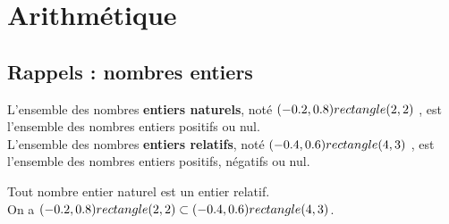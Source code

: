 



\chapter{Arithmétique}



\section{Rappels : nombres entiers}

\begin{Définition}
L'ensemble des nombres {\bf{entiers naturels}}, noté $(-0.2,0.8) rectangle (2,2)$ , est l'ensemble des nombres entiers positifs ou
nul.\\
L'ensemble des nombres {\bf{entiers relatifs}}, noté $(-0.4,0.6) rectangle (4,3)$ , est l'ensemble des nombres entiers positifs,
négatifs ou nul.
\end{Définition}

\begin{minipage}[c]{0.5\linewidth}

\begin{Remarque}
Tout nombre entier naturel est un entier relatif. \\On a $(-0.2,0.8) rectangle (2,2)\subset(-0.4,0.6) rectangle (4,3)$.
\end{Remarque}
\end{minipage} \hfill
\begin{minipage}[c]{0.45\linewidth}
\begin{center}  
\end{center}
\end{minipage}





